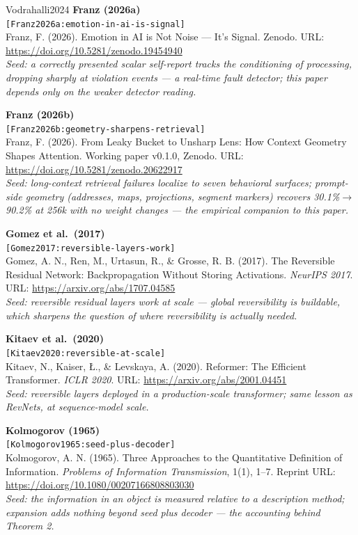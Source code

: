 \documentclass[11pt]{article}
\theoremstyle{remark}
\begin{document}
\begin{thebibliography}{Vodrahalli2024}
\textbf{Franz (2026a)}\\
{\small\texttt{[Franz2026a:emotion-in-ai-is-signal]}}\\
Franz, F. (2026). Emotion in AI is Not Noise --- It's Signal. Zenodo.
URL: \url{https://doi.org/10.5281/zenodo.19454940}\\
\emph{Seed: a correctly presented scalar self-report tracks the conditioning
of processing, dropping sharply at violation events --- a real-time fault
detector; this paper depends only on the weaker detector reading.}

\textbf{Franz (2026b)}\\
{\small\texttt{[Franz2026b:geometry-sharpens-retrieval]}}\\
Franz, F. (2026). From Leaky Bucket to Unsharp Lens: How Context Geometry
Shapes Attention. Working paper v0.1.0, Zenodo.
URL: \url{https://doi.org/10.5281/zenodo.20622917}\\
\emph{Seed: long-context retrieval failures localize to seven behavioral
surfaces; prompt-side geometry (addresses, maps, projections, segment markers)
recovers 30.1\%$\to$90.2\% at 256k with no weight changes --- the empirical
companion to this paper.}

\textbf{Gomez et al.\ (2017)}\\
{\small\texttt{[Gomez2017:reversible-layers-work]}}\\
Gomez, A. N., Ren, M., Urtasun, R., \& Grosse, R. B. (2017). The Reversible
Residual Network: Backpropagation Without Storing Activations.
\emph{NeurIPS 2017}. URL: \url{https://arxiv.org/abs/1707.04585}\\
\emph{Seed: reversible residual layers work at scale --- global reversibility
is buildable, which sharpens the question of where reversibility is actually
needed.}

\textbf{Kitaev et al.\ (2020)}\\
{\small\texttt{[Kitaev2020:reversible-at-scale]}}\\
Kitaev, N., Kaiser, {\L}., \& Levskaya, A. (2020). Reformer: The Efficient
Transformer. \emph{ICLR 2020}. URL: \url{https://arxiv.org/abs/2001.04451}\\
\emph{Seed: reversible layers deployed in a production-scale transformer; same
lesson as RevNets, at sequence-model scale.}

\textbf{Kolmogorov (1965)}\\
{\small\texttt{[Kolmogorov1965:seed-plus-decoder]}}\\
Kolmogorov, A. N. (1965). Three Approaches to the Quantitative Definition of
Information. \emph{Problems of Information Transmission}, 1(1), 1--7. Reprint
URL: \url{https://doi.org/10.1080/00207166808803030}\\
\emph{Seed: the information in an object is measured relative to a description
method; expansion adds nothing beyond seed plus decoder --- the accounting
behind Theorem 2.}


\end{thebibliography}
\end{document}
